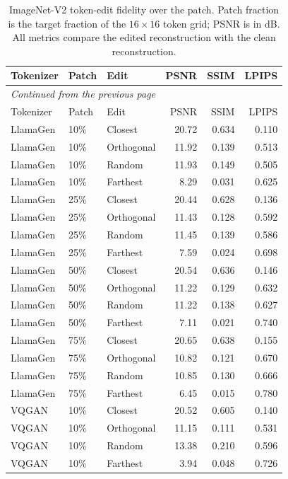 \begingroup
\small
\setlength{\tabcolsep}{4pt}
\begin{longtable}{lllrrr}
\caption[ImageNet-V2 token-edit fidelity over the patch]{ImageNet-V2 token-edit fidelity over the patch. Patch fraction is the target fraction of the $16\times16$ token grid; PSNR is in dB. All metrics compare the edited reconstruction with the clean reconstruction.}\label{tab:app_imagenetv2_patch_fidelity}\\
\hline
Tokenizer & Patch & Edit & PSNR & SSIM & LPIPS \\ \hline
\endfirsthead
\multicolumn{6}{l}{\small\itshape Continued from the previous page}\\
\hline
Tokenizer & Patch & Edit & PSNR & SSIM & LPIPS \\ \hline
\endhead
\hline
\endfoot
LlamaGen & 10\% & Closest & 20.72 & 0.634 & 0.110 \\
LlamaGen & 10\% & Orthogonal & 11.92 & 0.139 & 0.513 \\
LlamaGen & 10\% & Random & 11.93 & 0.149 & 0.505 \\
LlamaGen & 10\% & Farthest & 8.29 & 0.031 & 0.625 \\
LlamaGen & 25\% & Closest & 20.44 & 0.628 & 0.136 \\
LlamaGen & 25\% & Orthogonal & 11.43 & 0.128 & 0.592 \\
LlamaGen & 25\% & Random & 11.45 & 0.139 & 0.586 \\
LlamaGen & 25\% & Farthest & 7.59 & 0.024 & 0.698 \\
LlamaGen & 50\% & Closest & 20.54 & 0.636 & 0.146 \\
LlamaGen & 50\% & Orthogonal & 11.22 & 0.129 & 0.632 \\
LlamaGen & 50\% & Random & 11.22 & 0.138 & 0.627 \\
LlamaGen & 50\% & Farthest & 7.11 & 0.021 & 0.740 \\
LlamaGen & 75\% & Closest & 20.65 & 0.638 & 0.155 \\
LlamaGen & 75\% & Orthogonal & 10.82 & 0.121 & 0.670 \\
LlamaGen & 75\% & Random & 10.85 & 0.130 & 0.666 \\
LlamaGen & 75\% & Farthest & 6.45 & 0.015 & 0.780 \\
VQGAN & 10\% & Closest & 20.52 & 0.605 & 0.140 \\
VQGAN & 10\% & Orthogonal & 11.15 & 0.111 & 0.531 \\
VQGAN & 10\% & Random & 13.38 & 0.210 & 0.596 \\
VQGAN & 10\% & Farthest & 3.94 & 0.048 & 0.726 \\

\end{longtable}
